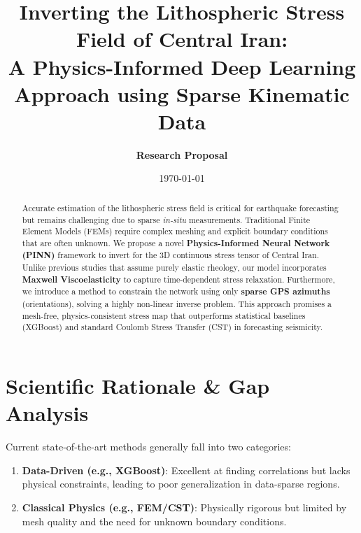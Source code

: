 \documentclass[11pt, a4paper]{article}
\title{\textbf{Inverting the Lithospheric Stress Field of Central Iran: \\ A Physics-Informed Deep Learning Approach using Sparse Kinematic Data}}
\author{\textbf{Research Proposal}}
\date{\today}
\begin{document}
\maketitle

\begin{abstract}
Accurate estimation of the lithospheric stress field is critical for earthquake forecasting but remains challenging due to sparse \textit{in-situ} measurements. Traditional Finite Element Models (FEMs) require complex meshing and explicit boundary conditions that are often unknown. We propose a novel \textbf{Physics-Informed Neural Network (PINN)} framework to invert for the 3D continuous stress tensor of Central Iran. Unlike previous studies that assume purely elastic rheology, our model incorporates \textbf{Maxwell Viscoelasticity} to capture time-dependent stress relaxation. Furthermore, we introduce a method to constrain the network using only \textbf{sparse GPS azimuths} (orientations), solving a highly non-linear inverse problem. This approach promises a mesh-free, physics-consistent stress map that outperforms statistical baselines (XGBoost) and standard Coulomb Stress Transfer (CST) in forecasting seismicity.
\end{abstract}

\section{Scientific Rationale \& Gap Analysis}
Current state-of-the-art methods generally fall into two categories:
\begin{enumerate}
    \item \textbf{Data-Driven (e.g., XGBoost)}: Excellent at finding correlations but lacks physical constraints, leading to poor generalization in data-sparse regions.
    \item \textbf{Classical Physics (e.g., FEM/CST)}: Physically rigorous but limited by mesh quality and the need for unknown boundary conditions.
\end{enumerate}
\end{document}
